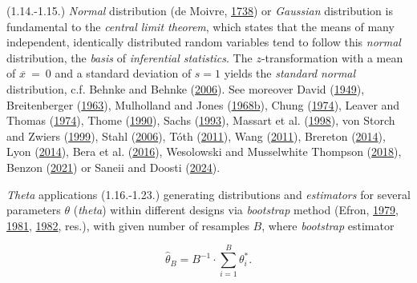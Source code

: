 \documentclass[
]{article}
\begin{document}
(1.14.-1.15.) \emph{Normal} distribution (de Moivre,
\href{https://books.google.com/books?id=PII_AAAAcAAJ}{1738}) or
\emph{Gaussian} distribution is fundamental to the \emph{central limit
theorem}, which states that the means of many independent, identically
distributed random variables tend to follow this \emph{normal}
distribution, the \emph{basis} of \emph{inferential statistics}. The
\(z\)-transformation with a mean of \(\overline{x\ } = \ 0\) and a
standard deviation of \(s = 1\) yields the \emph{standard} \emph{normal}
distribution, c.f. Behnke and Behnke
(\href{https://doi.org/10.1007/978-3-531-90003-2_26}{2006}). See
moreover David (\href{http://www.jstor.org/stable/2332676}{1949}),
Breitenberger (\href{http://www.jstor.org/stable/2333749}{1963}),
Mulholland and Jones
(\href{https://doi.org/10.1007/978-1-4899-6507-3_8}{1968b}), Chung
(\href{https://doi.org/10.1007/978-1-4757-3973-2_7}{1974}), Leaver and
Thomas (\href{https://doi.org/10.1007/978-1-349-01942-7_4}{1974}), Thome
(\href{http://www.jstor.org/stable/40986007}{1990}), Sachs
(\href{https://doi.org/10.1007/978-3-642-77717-2_4}{1993}), Massart et
al. (\href{https://doi.org/10.1016/S0922-3487(97)80033-0}{1998}), von
Storch and Zwiers
(\href{https://doi.org/10.1017/CBO9780511612336}{1999}), Stahl
(\href{http://www.jstor.org/stable/27642916}{2006}), Tóth
(\href{https://doi.org/10.1002/cem.1382}{2011}), Wang
(\href{https://doi.org/10.1016/j.spl.2011.03.037}{2011}), Brereton
(\href{https://doi.org/10.1002/cem.2655}{2014}), Lyon
(\href{https://doi.org/10.1093/bjps/axs046}{2014}), Bera et al.
(\href{http://www.jstor.org/stable/43948011}{2016}), Wesolowski and
Musselwhite Thompson
(\href{https://doi.org/10.4135/9781506326139.n476}{2018}), Benzon
(\href{https://doi.org/10.48188/so.2.6}{2021}) or Saneii and Doosti
(\href{https://doi.org/10.1007/978-981-97-3083-4_6}{2024}).

\emph{Theta} applications (1.16.-1.23.) generating distributions and
\emph{estimators} for several parameters \(\theta\) (\emph{theta})
within different designs via \emph{bootstrap} method (Efron,
\href{https://doi.org/10.1214/aos/1176344552}{1979},
\href{https://doi.org/10.1093/biomet/68.3.589}{1981},
\href{https://doi.org/10.1137/1.9781611970319}{1982}, res.), with given
number of resamples \(B\), where \emph{bootstrap} estimator

\[{\widehat{\theta}}_{B} = B^{- 1} \cdot \sum_{i = 1}^{B}\theta_{i}^{*}.\]
\end{document}
